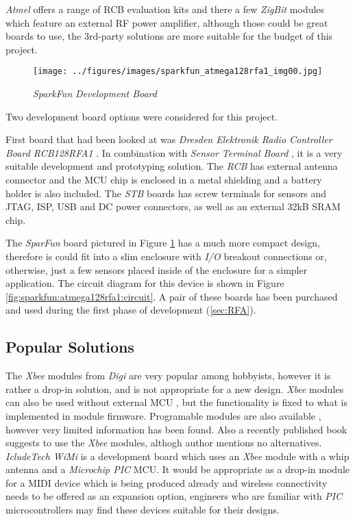  \emph{Atmel} offers a range of RCB evaluation kits
 \cite{links:atmel:rcb} and there a few \emph{ZigBit}
 modules which feature an external RF power amplifier,
 although those could be great boards to use, the
 3rd-party solutions are more suitable for the budget
 of this project.

 \begin{figure}
 \texttt{[image: ../figures/images/sparkfun\_atmega128rfa1\_img00.jpg]}
 \caption{\emph{SparkFun}  \emph{Development Board}} \label{fig:sparkfun:atmega128rfa1:image}
 \end{figure}

 Two development board options were considered for this project.

 First  board that had been looked at 
 was \emph{Dresden Elektronik Radio Controller Board RCB128RFA1}
 \cite{links:de:rcb}. In combination with \emph{Sensor Terminal
 Board} \cite{links:de:stb}, it is a very suitable development 
 and prototyping solution. The \emph{RCB} has external antenna
 connector and the MCU chip is enclosed in a metal shielding
 and a battery holder is also included. The \emph{STB} boards
 has screw terminals for sensors and JTAG, ISP, USB and DC
 power connectors, as well as an external 32kB SRAM chip.

 The \emph{SparFun} board pictured in Figure
 \ref{fig:sparkfun:atmega128rfa1:image}
 has a much more compact design, therefore is could fit
 into a slim enclosure with \emph{I/O} breakout connections
 or, otherwise, just a few sensors placed inside of the
 enclosure for a simpler application. The circuit diagram
 for this device is shown in Figure
 \ref{fig:sparkfun:atmega128rfa1:circuit}.
 A pair of these boards has been purchased and used during
 the first phase of development (\ref{sec:RFA}).

\subsection{Popular Solutions}

 The \emph{Xbee}\cite{links:digi:xbee} modules from \emph{Digi}
 are very popular among hobbyists, however it is rather a
 drop-in solution, and is not appropriate for a new design.
 \emph{Xbee} modules can also be used without external MCU
 \cite{links:misc:xbeemidi}, but the functionality is fixed
 to what is implemented in module firmware. Programable
 modules are also available \cite{links:xbee:wiki:prog},
 however very limited information has been found. Also a
 recently published \cite{noble2009programming} book suggests
 to use the \emph{Xbee} modules, althogh author mentions no
 alternatives. \emph{IcludeTech WiMi} \cite{links:includetech:wimi}
 is a development board which uses an \emph{Xbee} module with a whip
 antenna and a \emph{Microchip PIC} MCU. It would be appropriate as a
 drop-in module for a MIDI device which is being produced already and
 wireless connectivity needs to be offered as an expansion option,
 engineers who are familiar with \emph{PIC} microcontrollers may find
 these devices suitable for their designs.

